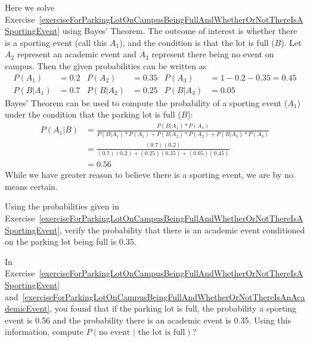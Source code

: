 \begin{example}{Here we solve Exercise~\ref{exerciseForParkingLotOnCampusBeingFullAndWhetherOrNotThereIsASportingEvent} using Bayes' Theorem.}
The outcome of interest is whether there is a sporting event (call this $A_1$), and the condition is that the lot is full ($B$). Let $A_2$ represent an academic event and $A_3$ represent there being no event on campus. Then the given probabilities can be written as\vspace{-1.5mm}
\begin{align*}
P(A_1) &= 0.2 &P(A_2) &= 0.35 &P(A_3) &= 1-0.2-0.35 = 0.45 \\
P(B | A_1) &= 0.7 &P(B | A_2) &= 0.25 &P(B | A_3) &= 0.05
\end{align*}
Bayes' Theorem can be used to compute the probability of a sporting event ($A_1$) under the condition that the parking lot is full ($B$):\vspace{-1.5mm}
\begin{align*}
P(A_1 | B) &= \frac{P(B | A_1)*P(A_1)}{P(B | A_1)*P(A_1) + P(B | A_2)*P(A_2) + P(B | A_3)*P(A_3)} \\
		&= \frac{(0.7)(0.2)}{(0.7)(0.2) + (0.25)(0.35) + (0.05)(0.45)} \\
		&= 0.56 
\end{align*}
While we have greater reason to believe there is a sporting event, we are by no means certain.
\end{example}

\begin{exercise} \label{exerciseForParkingLotOnCampusBeingFullAndWhetherOrNotThereIsAnAcademicEvent}
Using the probabilities given in Exercise~\ref{exerciseForParkingLotOnCampusBeingFullAndWhetherOrNotThereIsASportingEvent}, verify the probability that there is an academic event conditioned on the parking lot being full is 0.35.
\end{exercise}

\begin{exercise} \label{exerciseForParkingLotOnCampusBeingFullAndWhetherOrNotThereIsNoEvent}
In Exercise~\ref{exerciseForParkingLotOnCampusBeingFullAndWhetherOrNotThereIsASportingEvent} and~\ref{exerciseForParkingLotOnCampusBeingFullAndWhetherOrNotThereIsAnAcademicEvent}, you found that if the parking lot is full, the probability a sporting event is 0.56 and the probability there is an academic event is 0.35. Using this information, compute $P(\text{no event } | \text{ the lot is full})$?
\end{exercise}


